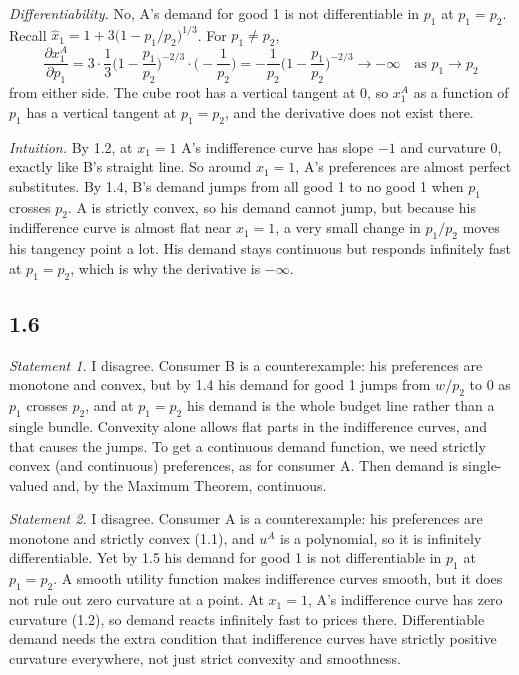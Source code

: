 \documentclass[12pt,letterpaper]{article}
\newif\ifshowhints
\newcommand{\hint}[1]{\ifshowhints{\color{blue}\small\textbf{Hint.} #1\par}\fi}
\begin{document}
\textit{Differentiability.} No, A's demand for good 1 is not differentiable in $p_1$ at $p_1=p_2$. Recall $\hat x_1 = 1+3\big(1-p_1/p_2\big)^{1/3}$. For $p_1\neq p_2$,
\[
\frac{\partial x_1^A}{\partial p_1} = 3\cdot\frac13\Big(1-\frac{p_1}{p_2}\Big)^{-2/3}\cdot\Big(-\frac{1}{p_2}\Big) = -\frac{1}{p_2}\Big(1-\frac{p_1}{p_2}\Big)^{-2/3} \to -\infty \quad \text{as } p_1\to p_2
\]
from either side. The cube root has a vertical tangent at $0$, so $x_1^A$ as a function of $p_1$ has a vertical tangent at $p_1=p_2$, and the derivative does not exist there.

\textit{Intuition.} By 1.2, at $x_1=1$ A's indifference curve has slope $-1$ and curvature $0$, exactly like B's straight line. So around $x_1=1$, A's preferences are almost perfect substitutes. By 1.4, B's demand jumps from all good 1 to no good 1 when $p_1$ crosses $p_2$. A is strictly convex, so his demand cannot jump, but because his indifference curve is almost flat near $x_1=1$, a very small change in $p_1/p_2$ moves his tangency point a lot. His demand stays continuous but responds infinitely fast at $p_1=p_2$, which is why the derivative is $-\infty$.

\subsection*{1.6}

\hint{Statement 1: consumer B has monotone and convex preferences; use 1.4. What extra assumption gives a continuous demand function? Statement 2: consumer A has monotone, strictly convex preferences and $u^A$ is a polynomial (infinitely differentiable); use 1.5.}

\textit{Statement 1.} I disagree. Consumer B is a counterexample: his preferences are monotone and convex, but by 1.4 his demand for good 1 jumps from $w/p_2$ to $0$ as $p_1$ crosses $p_2$, and at $p_1=p_2$ his demand is the whole budget line rather than a single bundle. Convexity alone allows flat parts in the indifference curves, and that causes the jumps. To get a continuous demand function, we need strictly convex (and continuous) preferences, as for consumer A. Then demand is single-valued and, by the Maximum Theorem, continuous.

\textit{Statement 2.} I disagree. Consumer A is a counterexample: his preferences are monotone and strictly convex (1.1), and $u^A$ is a polynomial, so it is infinitely differentiable. Yet by 1.5 his demand for good 1 is not differentiable in $p_1$ at $p_1=p_2$. A smooth utility function makes indifference curves smooth, but it does not rule out zero curvature at a point. At $x_1=1$, A's indifference curve has zero curvature (1.2), so demand reacts infinitely fast to prices there. Differentiable demand needs the extra condition that indifference curves have strictly positive curvature everywhere, not just strict convexity and smoothness.
\end{document}
